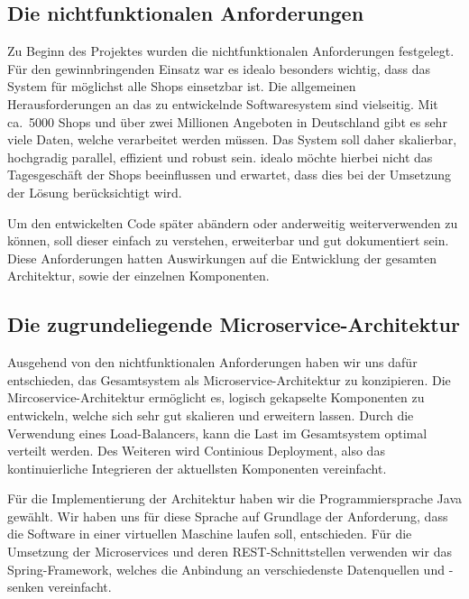 \subsection{Die nichtfunktionalen Anforderungen}
\label{subsec:nichtfunktionale-anforderungen}

Zu Beginn des Projektes wurden die nichtfunktionalen Anforderungen festgelegt.
Für den gewinnbringenden Einsatz war es idealo besonders wichtig, dass das System für möglichst alle Shops einsetzbar
ist.
Die allgemeinen Herausforderungen an das zu entwickelnde Softwaresystem sind vielseitig.
Mit ca.\ 5000 Shops und über zwei Millionen Angeboten in Deutschland gibt es sehr viele Daten, welche verarbeitet
werden müssen.
Das System soll daher skalierbar, hochgradig parallel, effizient und robust sein.
idealo möchte hierbei nicht das Tagesgeschäft der Shops beeinflussen und erwartet, dass dies bei der Umsetzung der
Lösung berücksichtigt wird.

Um den entwickelten Code später abändern oder anderweitig weiterverwenden zu können, soll dieser einfach zu
verstehen, erweiterbar und gut dokumentiert sein.
Diese Anforderungen hatten Auswirkungen auf die Entwicklung der gesamten Architektur, sowie der einzelnen Komponenten.

\subsection{Die zugrundeliegende Microservice-Architektur}
\label{subsec:microservice-architektur}

Ausgehend von den nichtfunktionalen Anforderungen haben wir uns dafür entschieden, das Gesamtsystem als
Microservice-Architektur zu konzipieren.
Die Mircoservice-Architektur ermöglicht es, logisch gekapselte Komponenten zu entwickeln, welche sich sehr gut
skalieren und erweitern lassen.
Durch die Verwendung eines Load-Balancers, kann die Last im Gesamtsystem optimal verteilt werden.
Des Weiteren wird Continious Deployment, also das kontinuierliche Integrieren der aktuellsten Komponenten vereinfacht.

Für die Implementierung der Architektur haben wir die Programmiersprache Java gewählt.
Wir haben uns für diese Sprache auf Grundlage der Anforderung, dass die Software in einer virtuellen Maschine laufen
soll, entschieden.
Für die Umsetzung der Microservices und deren REST-Schnittstellen verwenden wir das Spring-Framework, welches die
Anbindung an verschiedenste Datenquellen und -senken vereinfacht.

